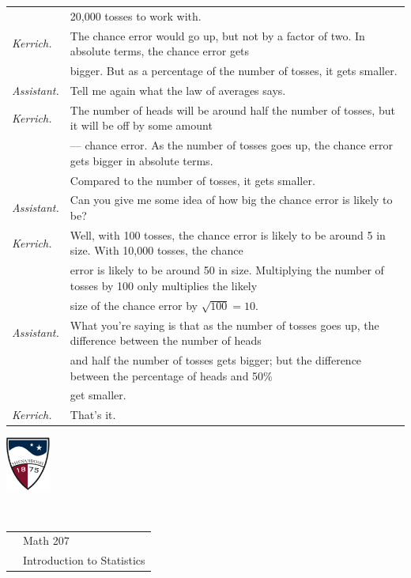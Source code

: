 \documentclass[10pt]{article}
\begin{document}
{\begin{tabular}{ll}
  & 20,000 tosses to work with.\\[3pt]
\textit{Kerrich.} & The chance error would go up, but not by a factor of two.  In absolute terms,
   the chance error gets\\
  & bigger.  But as a percentage of the number of tosses, it gets smaller. \\[3pt]
\textit{Assistant.} & Tell me again what the law of averages says.\\[3pt]
\textit{Kerrich.} & The number of heads will be around half the number of tosses, but it
  will be off by some amount \\ & --- chance error.  As the number of tosses
  goes up, the chance error gets bigger in absolute terms.  \\ & 
  Compared to the number of tosses, it gets smaller.\\[3pt]
\textit{Assistant.} & Can you give me some idea of how big the chance error is 
  likely to be?\\[3pt]
\textit{Kerrich.} & Well, with 100 tosses, the chance error is likely to be around 
  5 in size.  
  With 10,000 tosses, the chance \\ &error is likely to be around 50 in size. 
  Multiplying the number of tosses by 100 only multiplies the likely\\ & size 
of the chance error by $\sqrt{100} = 10$.\\[3pt]
\textit{Assistant.} & What you're saying is that as the number of tosses goes up, the difference between the number of heads\\
 &  and half the number of tosses gets bigger; but the difference between the percentage of heads and 50\%\\
  &  get smaller.\\[3pt]
\textit{Kerrich.} & That's it.\\[3pt]
\end{tabular}}

\vfill
\eject

\href{http://www.su.edu}{\includegraphics[height=1.75cm]{sulogo.eps}}
\vspace{-1.79cm}

{{\ }\hfill\small
\begin{tabular}{cl}
& Math 207\\
& Introduction to Statistics\\
\end{tabular}
}
\setlength{\baselineskip}{1.05\baselineskip}
\end{document}
